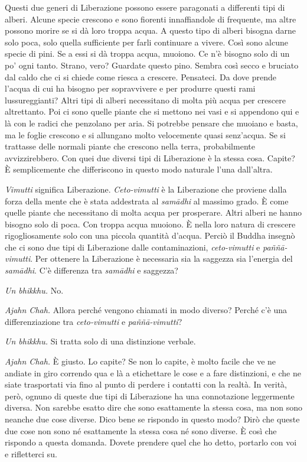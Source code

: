 Questi due generi di Liberazione possono essere paragonati a differenti
tipi di alberi. Alcune specie crescono e sono fiorenti innaffiandole di
frequente, ma altre possono morire se si dà loro troppa acqua. A questo
tipo di alberi bisogna darne solo poca, solo quella sufficiente per
farli continuare a vivere. Così sono alcune specie di pini. Se a essi si
dà troppa acqua, muoiono. Ce n'è bisogno solo di un po' ogni tanto.
Strano, vero? Guardate questo pino. Sembra così secco e bruciato dal
caldo che ci si chiede come riesca a crescere. Pensateci. Da dove prende
l'acqua di cui ha bisogno per sopravvivere e per produrre questi rami
lussureggianti? Altri tipi di alberi necessitano di molta più acqua per
crescere altrettanto. Poi ci sono quelle piante che si mettono nei vasi
e si appendono qui e là con le radici che penzolano per aria. Si
potrebbe pensare che muoiano e basta, ma le foglie crescono e si
allungano molto velocemente quasi senz'acqua. Se si trattasse delle
normali piante che crescono nella terra, probabilmente avvizzirebbero.
Con quei due diversi tipi di Liberazione è la stessa cosa. Capite? È
semplicemente che differiscono in questo modo naturale l'una dall'altra.

\emph{Vimutti} significa Liberazione. \emph{Ceto-vimutti} è la
Liberazione che proviene dalla forza della mente che è stata addestrata
al \emph{samādhi} al massimo grado. È come quelle piante che necessitano
di molta acqua per prosperare. Altri alberi ne hanno bisogno solo di
poca. Con troppa acqua muoiono. È nella loro natura di crescere
rigogliosamente solo con una piccola quantità d'acqua. Perciò il Buddha
insegnò che ci sono due tipi di Liberazione dalle contaminazioni,
\emph{ceto-vimutti} e \emph{paññā-vimutti}. Per ottenere la Liberazione
è necessaria sia la saggezza sia l'energia del \emph{samādhi}. C'è
differenza tra \emph{samādhi} e saggezza?

\emph{Un bhikkhu.} No.

\emph{Ajahn Chah.} Allora perché vengono chiamati in modo diverso? Perché c'è
una differenziazione tra \emph{ceto-vimutti} e \emph{paññā-vimutti}?

\emph{Un bhikkhu.} Si tratta solo di una distinzione verbale.

\emph{Ajahn Chah.} È giusto. Lo capite? Se non lo capite, è molto facile che ve
ne andiate in giro correndo qua e là a etichettare le cose e a fare
distinzioni, e che ne siate trasportati via fino al punto di perdere i
contatti con la realtà. In verità, però, ognuno di queste due tipi di
Liberazione ha una connotazione leggermente diversa. Non sarebbe esatto
dire che sono esattamente la stessa cosa, ma non sono neanche due cose
diverse. Dico bene se rispondo in questo modo? Dirò che queste due cose
non sono né esattamente la stessa cosa né sono diverse. È così che
rispondo a questa domanda. Dovete prendere quel che ho detto, portarlo
con voi e rifletterci su.

